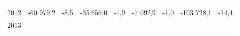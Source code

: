 \begin{longtable}[]{@{}lllllllll@{}}
\begin{minipage}[t]{0.12\columnwidth}
\strut
\end{minipage} & \begin{minipage}[t]{0.06\columnwidth}\raggedright
\strut
\end{minipage} & \begin{minipage}[t]{0.09\columnwidth}\raggedright
\strut
\end{minipage} & \begin{minipage}[t]{0.06\columnwidth}\raggedright
\strut
\end{minipage}\tabularnewline
\begin{minipage}[t]{0.05\columnwidth}\raggedright
2012\strut
\end{minipage} & \begin{minipage}[t]{0.10\columnwidth}\raggedright
-60 979,2\strut
\end{minipage} & \begin{minipage}[t]{0.06\columnwidth}\raggedright
-8,5\strut
\end{minipage} & \begin{minipage}[t]{0.16\columnwidth}\raggedright
-35 656,0\strut
\end{minipage} & \begin{minipage}[t]{0.06\columnwidth}\raggedright
-4,9\strut
\end{minipage} & \begin{minipage}[t]{0.12\columnwidth}\raggedright
-7 092,9\strut
\end{minipage} & \begin{minipage}[t]{0.06\columnwidth}\raggedright
-1,0\strut
\end{minipage} & \begin{minipage}[t]{0.09\columnwidth}\raggedright
-103 728,1\strut
\end{minipage} & \begin{minipage}[t]{0.06\columnwidth}\raggedright
-14,4\strut
\end{minipage}\tabularnewline
\begin{minipage}[t]{0.05\columnwidth}\raggedright
2013\strut
\end{minipage} & \begin{minipage}[t]{0.10\columnwidth}\raggedright
\strut
\end{minipage} & \begin{minipage}[t]{0.06\columnwidth}\raggedright
\strut
\end{minipage} & \begin{minipage}[t]{0.16\columnwidth}\raggedright
\strut
\end{minipage} & \begin{minipage}[t]{0.06\columnwidth}\raggedright

\end{minipage}
\end{longtable}
